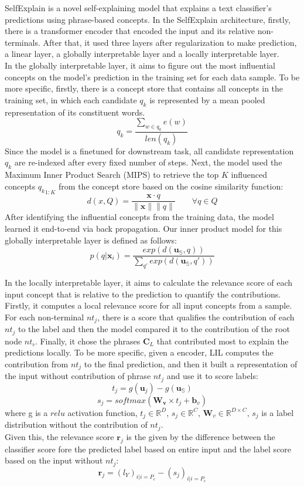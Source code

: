 \documentclass{article}
\begin{document}
SelfExplain is a novel self-explaining model that explains a text classifier's predictions using phrase-based concepts. In the SelfExplain architecture, firstly, there is a transformer encoder that encoded the input and its relative non-terminals. After that, it used three layers after regularization to make prediction, a linear layer, a globally interpretable layer and a locally interpretable layer. \\
In the globally interpretable layer, it aims to figure out the most influential concepts on the model's prediction in the training set for each data sample. To be more specific, firstly, there is a concept store that contains all concepts in the training set, in which each candidate $q_k$ is represented by a mean pooled representation of its constituent words. $$q_k = \frac{\sum_{w \in q_k}{e(w)}}{len(q_k)}  $$ Since the model is a finetuned for downstream task, all candidate representation $q_k$ are re-indexed after every fixed number of steps. 
Next, the model used the Maximum Inner Product Search (MIPS) to retrieve the top $K$ influenced concepts ${q_k}_{1:K}$ from the concept store based on the cosine similarity function: 
$$d(x, Q) = \frac{\mathbf{x} \cdot q}{ \|\mathbf{x}\| \|q\|}  \qquad  \forall q \in Q$$
After identifying the influential concepts from the training data, the model learned it end-to-end via back propagation. Our inner product model for this globally interpretable layer is defined as follows:
$$  p(q|\mathbf{x}_i) = \frac{exp(d(\mathbf{u}_\mathbb{S}, q))}{\sum_{q'} exp(d(\mathbf{u}_\mathbb{S}, q'))}$$

In the locally interpretable layer, it aims to calculate the relevance score of each input concept that is relative to the prediction to quantify the contributions. Firstly, it computes a local relevance score for all input concepts from a sample. For each non-terminal $nt_j$, there is a score that qualifies the contribution of each $nt_j$ to the label and then the model compared it to the contribution of the root node $nt_\mathbb{s}$. Finally, it chose the phrases $\mathbf{C}_L$ that contributed most to explain the predictions locally. To be more specific, given a encoder, LIL computes the contribution from $nt_j$ to the final prediction, and then it built a representation of the input without contribution of phrase $nt_j$ and use it to score labels:
$$t_j = g(\mathbf{u}_j) - g(\mathbf{u}_\mathbb{S})$$
$$s_j = softmax(\mathbf{W_v} \times t_j + \mathbf{b}_v)$$
where g is a $relu$ activation function, $t_j \in \mathbb{R}^D$, $s_j \in \mathbb{R}^C$, $\mathbf{W}_v \in \mathbb{R}^{D \times C}$, $s_j$ is a label distribution without the contribution of $nt_j$. \\
Given this, the relevance score $\mathbf{r}_j$ is the given by the difference between the classifier score fore the predicted label based on entire input and the label score based on the input without $nt_j$:
$$\mathbf{r}_j = (l_Y)_{i|i=P_c} - (s_j)_{i|i=P_c}$$
\end{document}
